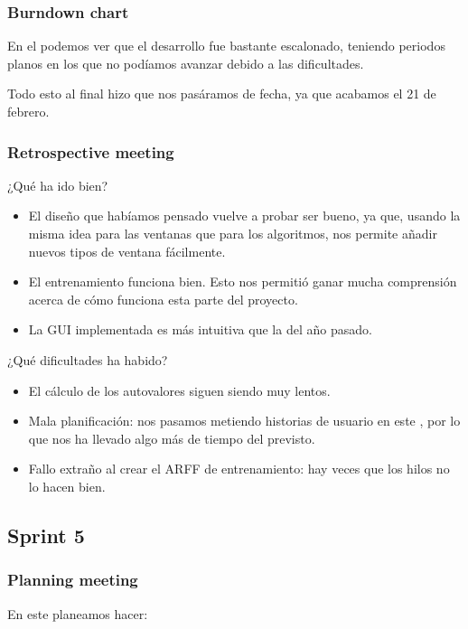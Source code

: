 \subsubsection*{Burndown chart}
En el \burndownchart{}  podemos ver que el desarrollo fue bastante escalonado, teniendo periodos planos en los que no podíamos avanzar debido a las dificultades.


Todo esto al final hizo que nos pasáramos de fecha, ya que acabamos el 21 de febrero.


\subsubsection*{Retrospective meeting}
¿Qué ha ido bien?
\begin{itemize}
 \item El diseño que habíamos pensado vuelve a probar ser bueno, ya que, usando la misma idea para las ventanas que para los algoritmos, nos permite añadir nuevos tipos de ventana fácilmente.
 \item El entrenamiento funciona bien. Esto nos permitió ganar mucha comprensión acerca de cómo funciona esta parte del proyecto.
 \item La GUI implementada es más intuitiva que la del año pasado.
\end{itemize}

¿Qué dificultades ha habido?
\begin{itemize}
 \item El cálculo de los autovalores siguen siendo muy lentos.
 \item Mala planificación: nos pasamos metiendo historias de usuario en este \sprint{}, por lo que nos ha llevado algo más de tiempo del previsto.
 \item Fallo extraño al crear el ARFF de entrenamiento: hay veces que los hilos no lo hacen bien.
\end{itemize}


\subsection{Sprint 5}
\subsubsection*{Planning meeting}
En este \sprint{} planeamos hacer:

